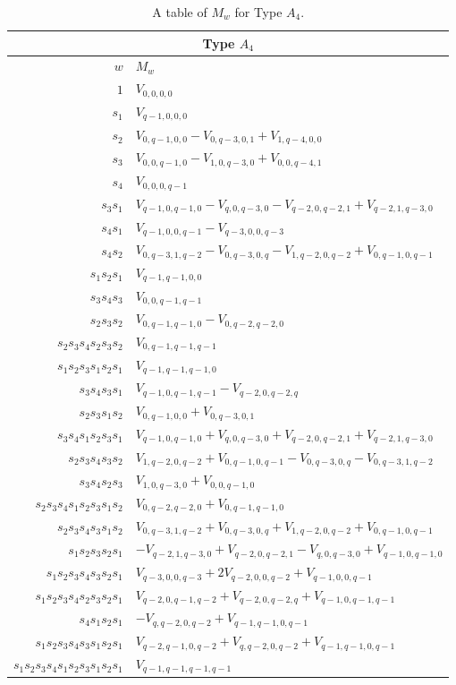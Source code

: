 \documentclass{amsart}
\theoremstyle{definition}
\begin{document}
\begin{table}
\renewcommand{\arraystretch}{1.5}
\caption{A table of $M_w$ for Type $A_4$.\label{tab:a4}}
\begin{tabular}{|r|l|}
\hline
\multicolumn{2}{||c||}{Type $A_4$}\\
\hline $w$ & $M_w$\\
\hline
    $1$ & $V_{0,0,0,0}$ \\
    $s_1$ & $V_{q-1,0,0,0}$ \\
    $s_2$ & $V_{0,q-1,0,0} - V_{0,q-3,0,1} + V_{1,q-4,0,0}$ \\
    $s_3$ & $V_{0,0,q-1,0} - V_{1,0,q-3,0} + V_{0,0,q-4,1}$ \\
    $s_4$ & $V_{0,0,0,q-1}$ \\
    $s_3s_1$ & $V_{q-1,0,q-1,0} - V_{q,0,q-3,0} - V_{q-2,0,q-2,1} + V_{q-2,1,q-3,0}$ \\
    $s_4s_1$ & $V_{q-1,0,0,q-1} - V_{q-3,0,0,q-3}$ \\
    $s_4s_2$ & $V_{0,q-3,1,q-2} - V_{0,q-3,0,q} - V_{1,q-2,0,q-2} + V_{0,q-1,0,q-1}$ \\      
    $s_1s_2s_1$ & $V_{q-1,q-1,0,0}$ \\
    $s_3s_4s_3$ & $V_{0,0,q-1,q-1}$ \\
    $s_2s_3s_2$ & $V_{0,q-1,q-1,0} - V_{0,q-2,q-2,0}$ \\
    $s_2s_3s_4s_2s_3s_2$ & $V_{0,q-1,q-1,q-1}$ \\
    $s_1s_2s_3s_1s_2s_1$ & $V_{q-1,q-1,q-1,0}$ \\
    $s_3s_4s_3s_1$ & $V_{q-1,0,q-1,q-1} - V_{q-2,0,q-2,q}$ \\
    $s_2s_3s_1s_2$ & $V_{0,q-1,0,0} + V_{0,q-3,0,1}$ \\
    $s_3s_4s_1s_2s_3s_1$ & $V_{q-1,0,q-1,0} + V_{q,0,q-3,0} + V_{q-2,0,q-2,1} + V_{q-2,1,q-3,0}$ \\
    $s_2s_3s_4s_3s_2$ & $V_{1,q-2,0,q-2} + V_{0,q-1,0,q-1} - V_{0,q-3,0,q} - V_{0,q-3,1,q-2}$ \\
    $s_3s_4s_2s_3$ & $V_{1,0,q-3,0} + V_{0,0,q-1,0}$ \\
$s_2s_3s_4s_1s_2s_3s_1s_2$ & $V_{0,q-2,q-2,0} + V_{0,q-1,q-1,0}$ \\            
$s_2s_3s_4s_3s_1s_2$ & $V_{0,q-3,1,q-2} + V_{0,q-3,0,q} + V_{1,q-2,0,q-2} + V_{0,q-1,0,q-1}$ \\
$s_1s_2s_3s_2s_1$ & $-V_{q-2,1,q-3,0} + V_{q-2,0,q-2,1} - V_{q,0,q-3,0} + V_{q-1,0,q-1,0}$ \\      
$s_1s_2s_3s_4s_3s_2s_1$ & $V_{q-3,0,0,q-3} + 2V_{q-2,0,0,q-2} + V_{q-1,0,0,q-1}$ \\                                 
$s_1s_2s_3s_4s_2s_3s_2s_1$ & $V_{q-2,0,q-1,q-2} + V_{q-2,0,q-2,q} + V_{q-1,0,q-1,q-1}$ \\                             
$s_4s_1s_2s_1$ & $-V_{q,q-2,0,q-2} + V_{q-1,q-1,0,q-1}$ \\   
$s_1s_2s_3s_4s_3s_1s_2s_1$ & $V_{q-2,q-1,0,q-2} + V_{q,q-2,0,q-2} + V_{q-1,q-1,0,q-1}$ \\                            
$s_1s_2s_3s_4s_1s_2s_3s_1s_2s_1$ & $V_{q-1,q-1,q-1,q-1}$ \\
\hline
\end{tabular}
\end{table}
\end{document}
